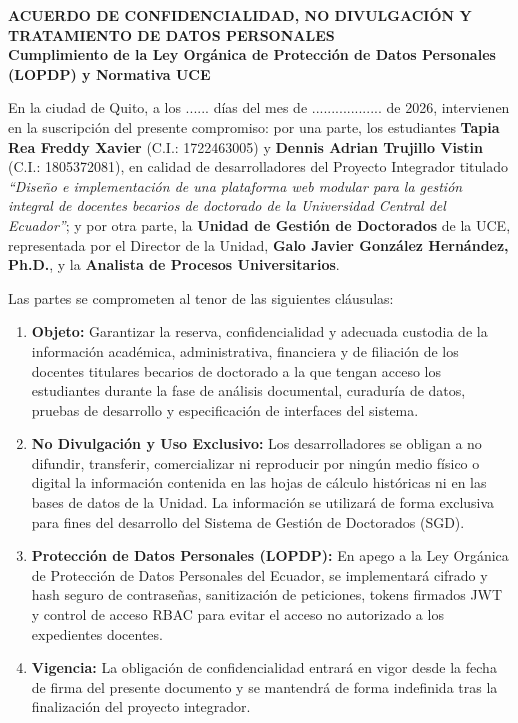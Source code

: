 
\pagestyle{empty}
\onehalfspacing
\fontsize{12}{18}\selectfont

\begin{center}
    \textbf{\Large ACUERDO DE CONFIDENCIALIDAD, NO DIVULGACIÓN Y TRATAMIENTO DE DATOS PERSONALES} \\[0.3cm]
    \textbf{\small Cumplimiento de la Ley Orgánica de Protección de Datos Personales (LOPDP) y Normativa UCE}
\end{center}

\vspace{0.6cm}

En la ciudad de Quito, a los ...... días del mes de .................. de 2026, intervienen en la suscripción del presente compromiso: por una parte, los estudiantes \textbf{Tapia Rea Freddy Xavier} (C.I.: 1722463005) y \textbf{Dennis Adrian Trujillo Vistin} (C.I.: 1805372081), en calidad de desarrolladores del Proyecto Integrador titulado \textit{“Diseño e implementación de una plataforma web modular para la gestión integral de docentes becarios de doctorado de la Universidad Central del Ecuador”}; y por otra parte, la \textbf{Unidad de Gestión de Doctorados} de la UCE, representada por el Director de la Unidad, \textbf{Galo Javier González Hernández, Ph.D.}, y la \textbf{Analista de Procesos Universitarios}.

Las partes se comprometen al tenor de las siguientes cláusulas:

\begin{enumerate}[label=\textbf{Cláusula \arabic*:},leftmargin=*]
    \item \textbf{Objeto:} Garantizar la reserva, confidencialidad y adecuada custodia de la información académica, administrativa, financiera y de filiación de los docentes titulares becarios de doctorado a la que tengan acceso los estudiantes durante la fase de análisis documental, curaduría de datos, pruebas de desarrollo y especificación de interfaces del sistema.
    \item \textbf{No Divulgación y Uso Exclusivo:} Los desarrolladores se obligan a no difundir, transferir, comercializar ni reproducir por ningún medio físico o digital la información contenida en las hojas de cálculo históricas ni en las bases de datos de la Unidad. La información se utilizará de forma exclusiva para fines del desarrollo del Sistema de Gestión de Doctorados (SGD).
    \item \textbf{Protección de Datos Personales (LOPDP):} En apego a la Ley Orgánica de Protección de Datos Personales del Ecuador, se implementará cifrado y hash seguro de contraseñas, sanitización de peticiones, tokens firmados JWT y control de acceso RBAC para evitar el acceso no autorizado a los expedientes docentes.
    \item \textbf{Vigencia:} La obligación de confidencialidad entrará en vigor desde la fecha de firma del presente documento y se mantendrá de forma indefinida tras la finalización del proyecto integrador.
\end{enumerate}

